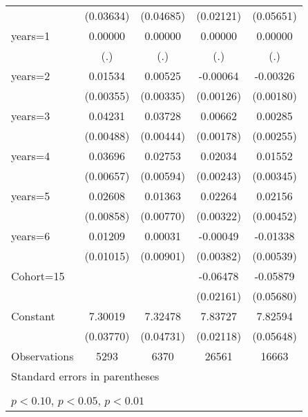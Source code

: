 \begin{table}[htbp]
\begin{tabular}{l*{4}{c}}
                    &   (0.03634)         &   (0.04685)         &   (0.02121)         &   (0.05651)         \\
\addlinespace
years=1             &     0.00000         &     0.00000         &     0.00000         &     0.00000         \\
                    &         (.)         &         (.)         &         (.)         &         (.)         \\
\addlinespace
years=2             &     0.01534\sym{***}&     0.00525         &    -0.00064         &    -0.00326\sym{*}  \\
                    &   (0.00355)         &   (0.00335)         &   (0.00126)         &   (0.00180)         \\
\addlinespace
years=3             &     0.04231\sym{***}&     0.03728\sym{***}&     0.00662\sym{***}&     0.00285         \\
                    &   (0.00488)         &   (0.00444)         &   (0.00178)         &   (0.00255)         \\
\addlinespace
years=4             &     0.03696\sym{***}&     0.02753\sym{***}&     0.02034\sym{***}&     0.01552\sym{***}\\
                    &   (0.00657)         &   (0.00594)         &   (0.00243)         &   (0.00345)         \\
\addlinespace
years=5             &     0.02608\sym{***}&     0.01363\sym{*}  &     0.02264\sym{***}&     0.02156\sym{***}\\
                    &   (0.00858)         &   (0.00770)         &   (0.00322)         &   (0.00452)         \\
\addlinespace
years=6             &     0.01209         &     0.00031         &    -0.00049         &    -0.01338\sym{**} \\
                    &   (0.01015)         &   (0.00901)         &   (0.00382)         &   (0.00539)         \\
\addlinespace
Cohort=15           &                     &                     &    -0.06478\sym{***}&    -0.05879         \\
                    &                     &                     &   (0.02161)         &   (0.05680)         \\
\addlinespace
Constant            &     7.30019\sym{***}&     7.32478\sym{***}&     7.83727\sym{***}&     7.82594\sym{***}\\
                    &   (0.03770)         &   (0.04731)         &   (0.02118)         &   (0.05648)         \\
\midrule
Observations        &        5293         &        6370         &       26561         &       16663         \\
\bottomrule
\multicolumn{5}{l}{\footnotesize Standard errors in parentheses}\\
\multicolumn{5}{l}{\footnotesize }\\
\multicolumn{5}{l}{\footnotesize \sym{*} \(p<0.10\), \sym{**} \(p<0.05\), \sym{***} \(p<0.01\)}\\
\end{tabular}
\end{table}
